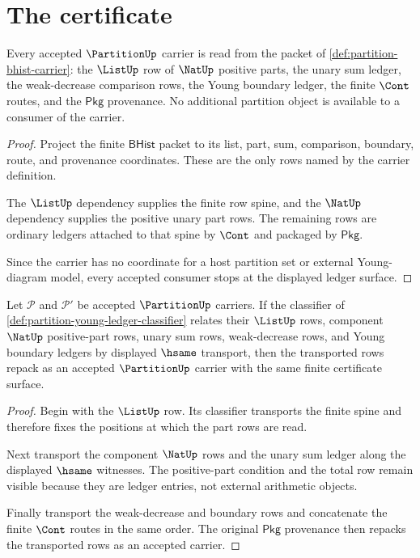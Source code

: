 \section{The certificate}
\label{sec:partition-certificate}

\begin{theorem}
\label{thm:partition-carrier-obligation}
Every accepted $\PartitionUp$ carrier is read from the packet of
\autoref{def:partition-bhist-carrier}: the $\ListUp$ row of $\NatUp$ positive
parts, the unary sum ledger, the weak-decrease comparison rows, the Young
boundary ledger, the finite $\Cont$ routes, and the $\mathsf{Pkg}$ provenance.
No additional partition object is available to a consumer of the carrier.
\end{theorem}
\begin{proof}
Project the finite $\mathsf{BHist}$ packet to its list, part, sum,
comparison, boundary, route, and provenance coordinates. These are the only
rows named by the carrier definition.

The $\ListUp$ dependency supplies the finite row spine, and the $\NatUp$
dependency supplies the positive unary part rows. The remaining rows are
ordinary ledgers attached to that spine by $\Cont$ and packaged by
$\mathsf{Pkg}$.

Since the carrier has no coordinate for a host partition set or external
Young-diagram model, every accepted consumer stops at the displayed ledger
surface.
\end{proof}

\begin{theorem}
\label{thm:partition-classifier-stability}
Let $\mathcal P$ and $\mathcal P'$ be accepted $\PartitionUp$ carriers. If the
classifier of \autoref{def:partition-young-ledger-classifier} relates their
$\ListUp$ rows, component $\NatUp$ positive-part rows, unary sum rows,
weak-decrease rows, and Young boundary ledgers by displayed $\hsame$
transport, then the transported rows repack as an accepted $\PartitionUp$
carrier with the same finite certificate surface.
\end{theorem}
\begin{proof}
Begin with the $\ListUp$ row. Its classifier transports the finite spine and
therefore fixes the positions at which the part rows are read.

Next transport the component $\NatUp$ rows and the unary sum ledger along the
displayed $\hsame$ witnesses. The positive-part condition and the total row
remain visible because they are ledger entries, not external arithmetic
objects.

Finally transport the weak-decrease and boundary rows and concatenate the
finite $\Cont$ routes in the same order. The original $\mathsf{Pkg}$
provenance then repacks the transported rows as an accepted carrier.
\end{proof}

